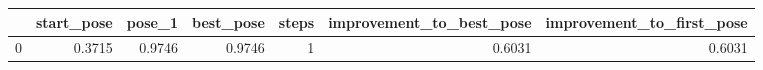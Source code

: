 \begin{tabular}{lrrrrrr}
\toprule
{} &  start\_pose &  pose\_1 &  best\_pose &  steps &  improvement\_to\_best\_pose &  improvement\_to\_first\_pose \\
\midrule
0 &      0.3715 &  0.9746 &     0.9746 &      1 &                    0.6031 &                     0.6031 \\
\bottomrule
\end{tabular}
